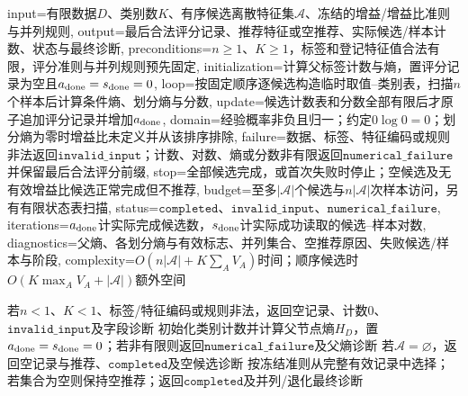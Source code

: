 \begin{AlgorithmContract}{
  input={有限数据$D$、类别数$K$、有序候选离散特征集$\mathcal A$、冻结的增益/增益比准则与并列规则},
  output={最后合法评分记录、推荐特征或空推荐、实际候选/样本计数、状态与最终诊断},
  preconditions={$n\ge1$、$K\ge1$，标签和登记特征值合法有限，评分准则与并列规则预先固定},
  initialization={计算父标签计数与熵，置评分记录为空且$a_{\rm done}=s_{\rm done}=0$},
  loop={按固定顺序逐候选构造临时取值--类别表，扫描$n$个样本后计算条件熵、划分熵与分数},
  update={候选计数表和分数全部有限后才原子追加评分记录并增加$a_{\rm done}$},
  domain={经验概率非负且归一；约定$0\log0=0$；划分熵为零时增益比未定义并从该排序排除},
  failure={数据、标签、特征编码或规则非法返回$\mathtt{invalid\_input}$；计数、对数、熵或分数非有限返回$\mathtt{numerical\_failure}$并保留最后合法评分前缀},
  stop={全部候选完成，或首次失败时停止；空候选及无有效增益比候选正常完成但不推荐},
  budget={至多$|\mathcal A|$个候选与$n|\mathcal A|$次样本访问，另有有限状态表扫描},
  status={$\mathtt{completed}$、$\mathtt{invalid\_input}$、$\mathtt{numerical\_failure}$},
  iterations={$a_{\rm done}$计实际完成候选数，$s_{\rm done}$计实际成功读取的候选--样本对数},
  diagnostics={父熵、各划分熵与有效标志、并列集合、空推荐原因、失败候选/样本与阶段},
  complexity={$O(n|\mathcal A|+K\sum_AV_A)$时间；顺序候选时$O(K\max_AV_A+|\mathcal A|)$额外空间}
}
\begin{algorithm}[H]
\caption{离散特征的信息增益与增益比评估}\label{alg:V1-C06-gain}
若$n<1$、$K<1$、标签/特征编码或规则非法，返回空记录、计数$0$、$\mathtt{invalid\_input}$及字段诊断\;
初始化类别计数并计算父节点熵$H_D$，置$a_{\rm done}=s_{\rm done}=0$；若非有限则返回$\mathtt{numerical\_failure}$及父熵诊断\;
若$\mathcal A=\varnothing$，返回空记录与推荐、$\mathtt{completed}$及空候选诊断\;
按冻结准则从完整有效记录中选择；若集合为空则保持空推荐；返回$\mathtt{completed}$及并列/退化最终诊断\;
\end{algorithm}
\end{AlgorithmContract}

